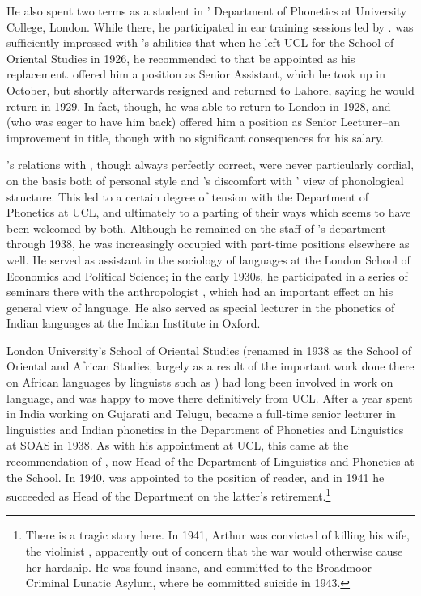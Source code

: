 He also spent two terms as a student in ' Department of
Phonetics at University College, London. While there, he participated
in ear training sessions led by . {\LloydJames} was
sufficiently impressed with {\Firth}'s abilities that when he left UCL for
the School of Oriental Studies in 1926, he recommended to {\Jones} that
{\Firth} be appointed as his replacement. {\Jones} offered him a position as
Senior Assistant, which he took up in October, but shortly afterwards
resigned and returned to Lahore, saying he would return in 1929. In
fact, though, he was able to return to London in 1928, and {\Jones} (who
was eager to have him back) offered him a position as Senior
Lecturer--an improvement in title, though with no significant
consequences for his salary.

{\Firth}'s relations with {\Jones}, though always perfectly correct, were
never particularly cordial, on the basis both of personal style and
{\Firth}'s discomfort with {\Jones}' view of phonological structure. This
led to a certain degree of tension with the Department of Phonetics at
UCL, and ultimately to a parting of their ways which seems to have
been welcomed by both.  Although he remained on the staff of {\Jones}'s
department through 1938, he was increasingly occupied with part-time
positions elsewhere as well. He served as assistant in the sociology
of languages at the London School of Economics and Political Science;
in the early 1930s, he participated in a series of seminars there with
the anthropologist , which had an important effect
on his general view of language. He also served as special lecturer in
the phonetics of Indian languages at the Indian Institute in Oxford.

London University's School of Oriental Studies (renamed in 1938 as the
School of Oriental and African Studies, largely as a result of the
important work done there on African languages by linguists such as
) had long been involved in work on language, and {\Firth} was
happy to move there definitively from UCL. After a year spent in India
working on Gujarati and Telugu, {\Firth} became a full-time senior
lecturer in linguistics and Indian phonetics in the Department of
Phonetics and Linguistics at SOAS in 1938. As with his appointment at
UCL, this came at the recommendation of {\LloydJames}, now Head of the
Department of Linguistics and Phonetics at the School.  In 1940, {\Firth}
was appointed to the position of reader, and in 1941 he succeeded
{\LloydJames} as Head of the Department on the latter's
retirement.\footnote{There is a tragic story here. In 1941, Arthur
  {\LloydJames} was convicted of killing his wife, the violinist , apparently out of concern that the war would
  otherwise cause her hardship. He was found insane, and committed to
  the Broadmoor Criminal Lunatic Asylum, where he committed suicide in
  1943.}

